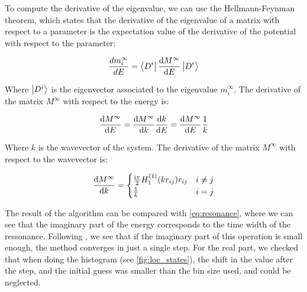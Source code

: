 To compute the derivative of the eigenvalue, we can use the Hellmann-Feynman theorem, which states that the derivative of the eigenvalue of a matrix with respect to a parameter is the expectation value of the derivative of the potential with respect to the parameter:

\begin{equation}
    \frac{d m_i^{\infty}}{dE}=\bra{D^i}\dv{M^{\infty}}{E}\ket{D^i}
\end{equation}

Where $\ket{D^i}$ is the eigenvector associated to the eigenvalue $m_i^{\infty}$. The derivative of the matrix $M^{\infty}$ with respect to the energy is:

\begin{equation}
    \dv{M^\infty}{E}=\dv{M^\infty}{k}\dv{k}{E}=\dv{M^\infty}{E}\frac{1}{k}
\end{equation}

Where $k$ is the wavevector of the system. The derivative of the matrix $M^{\infty}$ with respect to the wavevector is:

\begin{equation}
    \dv{M^\infty}{k}=\begin{cases}
        \frac{\text{i}\pi}{2}H_1^{(1)}(kr_{ij})r_{ij}&i\neq j \\
        \frac{1}{k}& i=j
    \end{cases}
\end{equation}

The result of the algorithm can be compared with \cref{eq:resonance}, where we can see that the imaginary part of the energy corresponds to the time width of the ressonance. Following \cite{antezzaQuantitativeStudyTwo2010}, we see that if the imaginary part of this operation is small enough, the method converges in just a single step. For the real part, we checked that when doing the histogram (see \cref{fig:loc_states}), the shift in the value after the step, and the initial guess was smaller than the bin size used, and could be neglected.